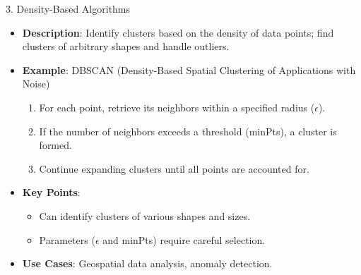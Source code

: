 \documentclass[aspectratio=169]{beamer}
\begin{document}
\begin{frame}[fragile]
    \begin{block}{3. Density-Based Algorithms}
        \begin{itemize}
            \item \textbf{Description}: Identify clusters based on the density of data points; find clusters of arbitrary shapes and handle outliers.
            \item \textbf{Example}: DBSCAN (Density-Based Spatial Clustering of Applications with Noise)
            \begin{enumerate}
                \item For each point, retrieve its neighbors within a specified radius ($\epsilon$).
                \item If the number of neighbors exceeds a threshold (minPts), a cluster is formed.
                \item Continue expanding clusters until all points are accounted for.
            \end{enumerate}
            \item \textbf{Key Points}:
            \begin{itemize}
                \item Can identify clusters of various shapes and sizes.
                \item Parameters ($\epsilon$ and minPts) require careful selection.
            \end{itemize}
            \item \textbf{Use Cases}: Geospatial data analysis, anomaly detection.
        \end{itemize}
    \end{block}
\end{frame}
\end{document}
